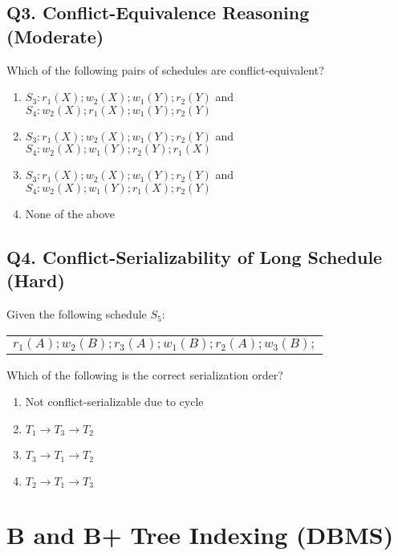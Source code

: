 \subsection*{Q3. Conflict-Equivalence Reasoning (Moderate)}
Which of the following pairs of schedules are conflict-equivalent?

\begin{enumerate}[label=(\alph*)]
    \item $S_3: r_1(X); w_2(X); w_1(Y); r_2(Y)$ and $S_4: w_2(X); r_1(X); w_1(Y); r_2(Y)$
    \item $S_3: r_1(X); w_2(X); w_1(Y); r_2(Y)$ and $S_4: w_2(X); w_1(Y); r_2(Y); r_1(X)$
    \item $S_3: r_1(X); w_2(X); w_1(Y); r_2(Y)$ and $S_4: w_2(X); w_1(Y); r_1(X); r_2(Y)$
    \item None of the above
\end{enumerate}

\subsection*{Q4. Conflict-Serializability of Long Schedule (Hard)}
Given the following schedule $S_5$:

\begin{center}
\begin{tabular}{l}
    $r_1(A); w_2(B); r_3(A); w_1(B); r_2(A); w_3(B);$
\end{tabular}
\end{center}

Which of the following is the correct serialization order?

\begin{enumerate}[label=(\alph*)]
    \item Not conflict-serializable due to cycle
    \item $T_1 \rightarrow T_3 \rightarrow T_2$
    \item $T_3 \rightarrow T_1 \rightarrow T_2$
    \item $T_2 \rightarrow T_1 \rightarrow T_3$
\end{enumerate}


\section{B and B+ Tree Indexing (DBMS)}

